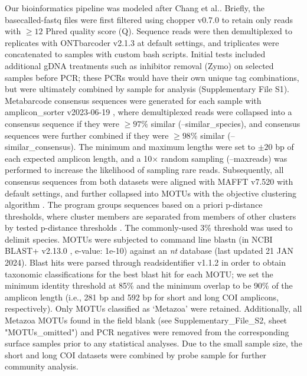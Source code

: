 Our bioinformatics pipeline was modeled after Chang et al.\cite{chang-2023}. Briefly, the basecalled-fastq files were first filtered using chopper v0.7.0 \cite{coster-2023} to retain only reads with $\geq 12$ Phred quality score (Q). Sequence reads were then demultiplexed to replicates with ONTbarcoder v2.1.3 \cite{srivathsan-2024} at default settings, and triplicates were concatenated to samples with custom bash scripts. Initial tests included additional gDNA treatments such as inhibitor removal (Zymo) on selected samples before PCR; these PCRs would have their own unique tag combinations, but were ultimately combined by sample for analysis (Supplementary File S1). Metabarcode consensus sequences were generated for each sample with amplicon\_sorter v2023-06-19 \cite{vierstraete-2022}, where demultiplexed reads were collapsed into a consensus sequence if they were $\geq 97 \%$ similar (--similar\_species), and consensus sequences were further combined if they were $\geq 98 \%$  similar (--similar\_consensus). The minimum and maximum lengths were set to $\pm 20$ bp of each expected amplicon length, and a 10× random sampling (--maxreads) was performed to increase the likelihood of sampling rare reads. Subsequently, all consensus sequences from both datasets were aligned with MAFFT v7.520 \cite{katoh-2013} with default settings, and further collapsed into \glspl{MOTU} with the objective clustering algorithm \cite{obj-cluster}. The program groups sequences based on a priori p-distance thresholds, where cluster members are separated from members of other clusters by tested p-distance thresholds \cite{meier-2006}. The commonly-used 3\% threshold was used to delimit species. \glspl{MOTU} were subjected to command line blastn (in NCBI BLAST+ v2.13.0 \cite{camacho-2009}, e-value: 1e-10) against an \textit{nt} database (last updated 21 JAN 2024). Blast hits were parsed through readsidentifier v1.1.2 \cite{srivathsan-2015} in order to obtain taxonomic classifications for the best blast hit for each \gls{MOTU}; we set the minimum identity threshold at 85\% and the minimum overlap to be 90\% of the amplicon length (i.e., 281 bp and 592 bp for short and long COI amplicons, respectively). Only \glspl{MOTU} classified as ‘Metazoa’ were retained. Additionally, all Metazoa \glspl{MOTU} found in the field blank (see Supplementary\_File\_S2, sheet "MOTUs\_omitted") and PCR negatives were removed from the corresponding surface samples prior to any statistical analyses. Due to the small sample size, the short and long COI datasets were combined by probe sample for further community analysis.

